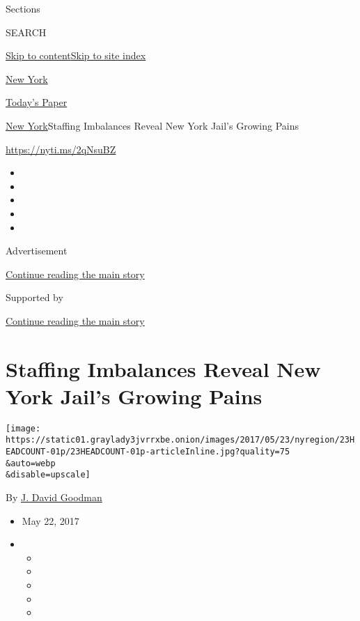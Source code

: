 Sections

SEARCH

\protect\hyperlink{site-content}{Skip to
content}\protect\hyperlink{site-index}{Skip to site index}

\href{https://www.nytimes3xbfgragh.onion/section/nyregion}{New York}

\href{https://myaccount.nytimes3xbfgragh.onion/auth/login?response_type=cookie\&client_id=vi}{}

\href{https://www.nytimes3xbfgragh.onion/section/todayspaper}{Today's
Paper}

\href{/section/nyregion}{New York}\textbar{}Staffing Imbalances Reveal
New York Jail's Growing Pains

\url{https://nyti.ms/2qNsuBZ}

\begin{itemize}
\item
\item
\item
\item
\item
\end{itemize}

Advertisement

\protect\hyperlink{after-top}{Continue reading the main story}

Supported by

\protect\hyperlink{after-sponsor}{Continue reading the main story}

\hypertarget{staffing-imbalances-reveal-new-york-jails-growing-pains}{%
\section{Staffing Imbalances Reveal New York Jail's Growing
Pains}\label{staffing-imbalances-reveal-new-york-jails-growing-pains}}

\texttt{[image: https://static01.graylady3jvrrxbe.onion/images/2017/05/23/nyregion/23HEADCOUNT-01p/23HEADCOUNT-01p-articleInline.jpg?quality=75\\\&auto=webp\\\&disable=upscale]}

By \href{http://www.nytimes3xbfgragh.onion/by/j-david-goodman}{J. David
Goodman}

\begin{itemize}
\item
  May 22, 2017
\item
  \begin{itemize}
  \item
  \item
  \item
  \item
  \item
  \end{itemize}
\end{itemize}

